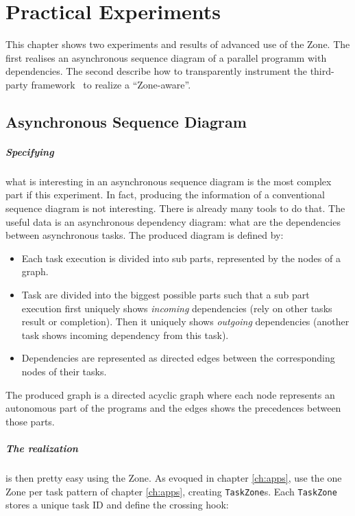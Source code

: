 
\chapter{Practical Experiments}
\label{ch:inpractice}

This chapter shows two experiments and results of advanced use of the Zone. The first realises an asynchronous sequence diagram of a parallel programm with dependencies. The second describe how to transparently instrument the third-party framework \vertx\ to realize a ``Zone-aware\vertx''.

\section{Asynchronous Sequence Diagram}


\paragraph{Specifying} what is interesting in an asynchronous sequence diagram is the most complex part if this experiment. In fact, producing the information of a conventional sequence diagram is not interesting. There is already many tools to do that. The useful data is an asynchronous dependency diagram: what are the dependencies between asynchronous tasks. The produced diagram is defined by:

\begin{itemize}
\item Each task execution is divided into sub parts, represented by the nodes of a graph.
\item Task are divided into the biggest possible parts such that a sub part execution first uniquely shows \emph{incoming} dependencies (rely on other tasks result or completion). Then it uniquely shows \emph{outgoing} dependencies (another task shows incoming dependency from this task).
\item Dependencies are represented as directed edges between the corresponding nodes of their tasks.
\end{itemize}

The produced graph is a directed acyclic graph where each node represents an autonomous part of the programs and the edges shows the precedences between those parts.

\paragraph{The realization} is then pretty easy using the Zone. As evoqued in chapter \ref{ch:apps}, use the one Zone per task pattern of chapter \ref{ch:apps}, creating \lstinline{TaskZone}s. Each \lstinline{TaskZone} stores a unique task ID and define the crossing hook: 

